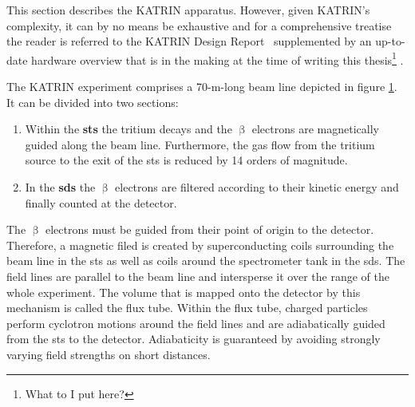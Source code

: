 \begin{figure}[t]
 \label{fig:katrinExpSetupBeamline}
\end{figure}
This section describes the KATRIN apparatus. However, given KATRIN's complexity, it can by no means be exhaustive and for a comprehensive treatise the reader is referred to the KATRIN Design Report~\cite{Angrik:2005ep} supplemented by an up-to-date hardware overview that is in the making at the time of writing this thesis\footnote{What to I put here?} .

The KATRIN experiment comprises a 70-m-long beam line depicted in figure \ref{fig:katrinExpSetupBeamline}. It can be divided into two sections: 
\begin{enumerate}
    \item Within the \textbf{\gls{sts}} the tritium decays and the $\upbeta$ electrons are magnetically guided along the beam line. Furthermore, the gas flow from the tritium source to the exit of the \gls{sts} is reduced by 14 orders of magnitude.
    \item In the \textbf{\gls{sds}} the $\upbeta$ electrons are filtered according to their kinetic energy and finally counted at the detector.
\end{enumerate}
The $\upbeta$ electrons must be guided from their point of origin to the detector. Therefore, a magnetic filed is created by superconducting coils surrounding the beam line in the \gls{sts} as well as coils around the spectrometer tank in the \gls{sds}. The field lines are parallel to the beam line and intersperse it over the range of the whole experiment. The volume that is mapped onto the detector by this mechanism is called the flux tube. Within the flux tube, charged particles perform cyclotron motions around the field lines and are adiabatically guided from the \gls{sts} to the detector. Adiabaticity is guaranteed by avoiding strongly varying field strengths on short distances. 

